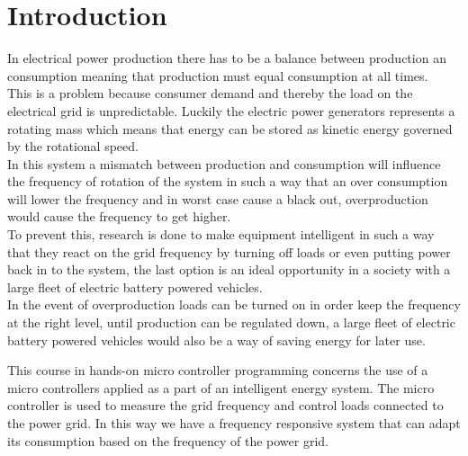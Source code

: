 \chapter{Introduction}
\label{chap:intro}
In electrical power production there has to be a balance between production an consumption meaning that production must equal consumption at all times.\\ This is a problem because consumer demand and thereby the load on the electrical grid is unpredictable. Luckily the electric power generators represents a rotating mass which means that energy can be stored as kinetic energy governed by the rotational speed.\\ In this system a mismatch between production and consumption will influence the frequency of rotation of the system in such a way that an over consumption will lower the frequency and in worst case cause a black out, overproduction would cause the frequency to get higher.\\ To prevent this, research is done to make equipment intelligent in such a way that they react on the grid frequency by turning off loads or even putting power back in to the system, the last option is an ideal opportunity in a society with a large fleet of electric battery powered vehicles.\\ In the event of overproduction loads can be turned on in order keep the frequency at the right level, until production can be regulated down, a large fleet of electric battery powered vehicles would also be a way of saving energy for later use.

This course in hands-on micro controller programming concerns the use of a micro controllers applied as a part of an intelligent energy system. The micro controller is used to measure the grid frequency and control loads connected to the power grid. In this way we have a frequency responsive system that can adapt its consumption based on the frequency of the power grid.
